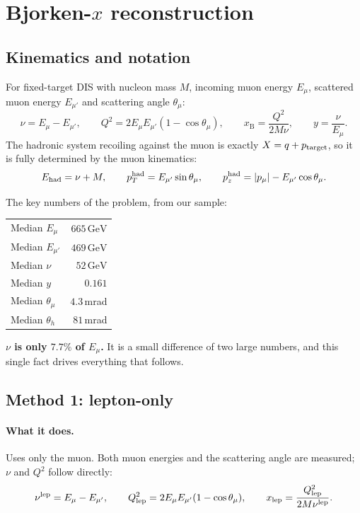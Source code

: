 \documentclass[11pt,a4paper]{article}
\newcommand{\xB}{x_{\mathrm{B}}}
\newcommand{\Ein}{E_{\mu}}
\newcommand{\Eout}{E_{\mu'}}
\newcommand{\Ehad}{E_{\mathrm{had}}}
\newcommand{\thmu}{\theta_{\mu}}
\newcommand{\thh}{\theta_{h}}
\newcommand{\GeV}{\,\mathrm{GeV}}
\begin{document}
\section{Bjorken-$x$ reconstruction}
\label{sec:xreco}

\subsection{Kinematics and notation}
For fixed-target DIS with nucleon mass $M$, incoming muon energy $\Ein$,
scattered muon energy $\Eout$ and scattering angle $\thmu$:
\begin{equation}
  \nu = \Ein - \Eout, \qquad
  Q^2 = 2\Ein\Eout(1-\cos\thmu), \qquad
  \xB = \frac{Q^2}{2M\nu}, \qquad y=\frac{\nu}{\Ein}.
\end{equation}
The hadronic system recoiling against the muon is exactly $X=q+p_{\rm target}$,
so it is fully determined by the muon kinematics:
\begin{equation}
  \Ehad = \nu + M,\qquad
  p_T^{\rm had} = \Eout\sin\thmu,\qquad
  p_z^{\rm had} = |p_\mu| - \Eout\cos\thmu .
  \label{eq:hadcons}
\end{equation}

The key numbers of the problem, from our sample:
\begin{center}\small
\begin{tabular}{lr}
\toprule
Median $\Ein$ & $665\GeV$ \\
Median $\Eout$ & $469\GeV$ \\
Median $\nu$ & $52\GeV$ \\
Median $y$ & $0.161$ \\
Median $\thmu$ & $4.3\,$mrad \\
Median $\thh$ & $81\,$mrad \\
\bottomrule
\end{tabular}
\end{center}
\textbf{$\nu$ is only $7.7\%$ of $\Ein$.} It is a small difference of two large
numbers, and this single fact drives everything that follows.

\subsection{Method 1: lepton-only}
\label{sec:lepton}

\paragraph{What it does.} Uses only the muon. Both muon energies and the
scattering angle are measured; $\nu$ and $Q^2$ follow directly:
\begin{equation}
  \nu^{\rm lep} = \Ein - \Eout,\qquad
  Q^2_{\rm lep} = 2\Ein\Eout(1-\cos\thmu),\qquad
  x_{\rm lep} = \frac{Q^2_{\rm lep}}{2M\nu^{\rm lep}} .
\end{equation}
\end{document}
